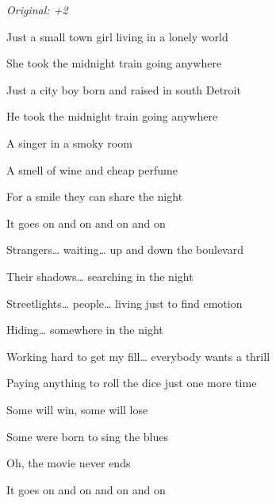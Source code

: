 \begin{song}


\begin{strumbox}
\textit{Original: +2}
\end{strumbox}

\begin{hchordbox}
\end{hchordbox}

\Large

\bigskip

 Just a small town girl  living in a lonely world \par
{} She took the midnight train going anywhere  \par
{} Just a city boy  born and raised in south Detroit \par
{} He took the midnight train going anywhere  \par

\bigskip

    \par
{}    \par
{} A singer in a smoky room \par
{} A smell of wine and cheap perfume \par
{} For a smile they can share the night \par
It goes on and on and on and on \par

\bigskip

Strangers… waiting…  up and down the boulevard \par
Their shadows… searching in the night \par
{}Streetlights… people…  living just to find emotion \par
{}Hiding… somewhere in the night \par

\bigskip

 Working hard to get my fill…  everybody wants a thrill \par
{} Paying anything to roll the dice just one more time  \par
{} Some will win,  some will lose \par
{} Some were born to sing the blues \par
{} Oh, the movie never ends \par
It goes on and on and on and on \par


\end{song}
